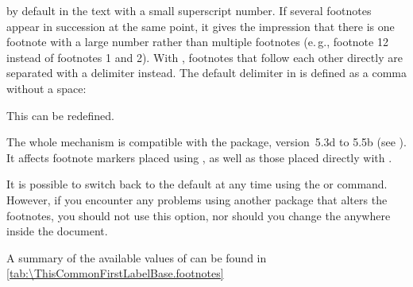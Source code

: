 \begin{Declaration}
\end{Declaration}
%
by default in the text with a small superscript number. If several footnotes
appear in succession at the same point, it gives the impression that there is
one footnote with a large number rather than multiple footnotes (e.\,g.,
footnote 12 instead of footnotes 1 and 2).
With
, footnotes
that follow each other directly are separated with a delimiter instead. The
default delimiter in  is
defined as a comma without a space:
\begin{lstcode}
  \newcommand*{\multfootsep}{,}
\end{lstcode}
This can be redefined.

The whole mechanism is compatible with the 
package, version~5.3d to 5.5b (see \cite{package:footmisc}). It affects
footnote markers placed using 
, as well as 
those placed directly with 
.

It is possible to switch back to the default 
 at any time using the 
 or
 command. However, if you
encounter any problems using another package that alters the footnotes, you
should not use this option, nor should you change the  anywhere
inside the document.

A summary of the available  values of  can
be found in \autoref{tab:\ThisCommonFirstLabelBase.footnotes}%
%
%
\EndIndexGroup


